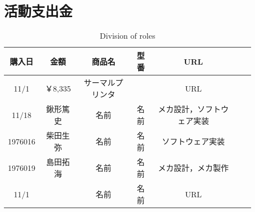 \section{活動支出金}

\begin{table}[htbp]
\begin{center}
\caption{Division of roles}  %
\renewcommand{\tablename}{Table}
\begin{tabular}{|c|c|c|c|c|c|c|}
\hline
購入日 &金額&商品名&型番&URL\\ \hline\hline
11/1& ￥8,335&サーマルプリンタ&&URL\\ \hline
11/18& 鍬形篤史&名前&名前&メカ設計，ソフトウェア実装\\ \hline
1976016& 柴田生弥&名前&名前&ソフトウェア実装\\ \hline
1976019&島田拓海&名前&名前&メカ設計，メカ製作\\ \hline
11/1& &名前&名前&URL\\ \hline
\end{tabular}
\label{tbl:clock}
\end{center}
\end{table}
